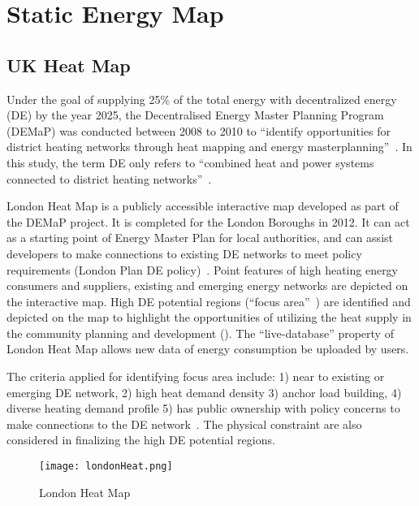 \section{Static Energy Map}\label{staticEnergyMap}
\subsection{UK Heat Map}
Under the goal of supplying 25\% of the total energy with
decentralized energy (DE) by the year 2025, the Decentralised Energy
Master Planning Program (DEMaP) was conducted between 2008 to 2010 to
``identify opportunities for district heating networks through heat
mapping and energy masterplanning''~\cite{londonHeatMap}. In this
study, the term DE only refers to ``combined heat and power systems
connected to district heating
networks''~\cite{decentralHeatMap2011}. 

London Heat Map is a publicly accessible interactive map developed as
part of the DEMaP project. It is completed for the London Boroughs in
2012. It can act as a starting point of Energy Master Plan for local
authorities, and can assist developers to make connections to existing
DE networks to meet policy requirements (London Plan DE
policy)~\cite{decentralHeatMap2011, londonHeatMap}. Point features of
high heating energy consumers and suppliers, existing and emerging
energy networks are depicted on the interactive map. High DE potential
regions (``focus area''~\cite{decentralHeatMap2011}) are identified
and depicted on the map to highlight the opportunities of utilizing
the heat supply in the community planning and development
(). The ``live-database'' property of London Heat
Map allows new data of energy consumption be uploaded by users.

The criteria applied for identifying focus area include: 1) near to
existing or emerging DE network, 2) high heat demand density 3) anchor
load building, 4) diverse heating demand profile 5) has public
ownership with policy concerns to make connections to the DE
network~\cite{decentralHeatMap2011}. The physical constraint are also
considered in finalizing the high DE potential regions.
\begin{figure}[h!]
  \centering
  \texttt{[image: londonHeat.png]}
  \caption[London Heat Map]{London Heat Map~\cite{londonHeatMapMap}}
  \label{fig:londonHeat}
\end{figure}

